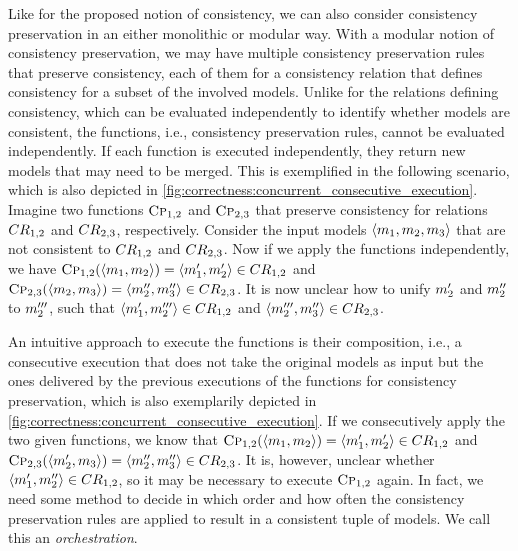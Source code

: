 Like for the proposed notion of consistency, we can also consider consistency preservation in an either monolithic or modular way.
With a modular notion of consistency preservation, we may have multiple consistency preservation rules that preserve consistency, each of them for a consistency relation that defines consistency for a subset of the involved models.
Unlike for the relations defining consistency, which can be evaluated independently to identify whether models are consistent, the functions, i.e., consistency preservation rules, cannot be evaluated independently.
If each function is executed independently, they return new models that may need to be merged. 
This is exemplified in the following scenario, which is also depicted in \autoref{fig:correctness:concurrent_consecutive_execution}.
Imagine two functions $\textsc{Cp}_{1,2}$ and $\textsc{Cp}_{2,3}$ that preserve consistency for relations $\consistencyrelation{CR}{1,2}$ and $\consistencyrelation{CR}{2,3}$, respectively.
Consider the input models $\tupled{\model{m}{1}, \model{m}{2}, \model{m}{3}}$ that are not consistent to $\consistencyrelation{CR}{1,2}$ and $\consistencyrelation{CR}{2,3}$.
Now if we apply the functions independently, we have $\function{Cp}_{1,2}(\tupled{\model{m}{1}, \model{m}{2}}) = \tupled{\model{m}{1}', \model{m}{2}'} \in \consistencyrelation{CR}{1,2}$ and 
$\function{Cp}_{2,3}(\tupled{\model{m}{2}, \model{m}{3}}) = \tupled{\model{m}{2}'', \model{m}{3}''} \in \consistencyrelation{CR}{2,3}$.
It is now unclear how to unify $\model{m}{2}'$ and $\model{m}{2}''$ to $\model{m}{2}'''$, such that $\tupled{\model{m}{1}', \model{m}{2}'''} \in \consistencyrelation{CR}{1,2}$ and  $\tupled{\model{m}{2}''', \model{m}{3}''} \in \consistencyrelation{CR}{2,3}$.

An intuitive approach to execute the functions is their composition, i.e., a consecutive execution that does not take the original models as input but the ones delivered by the previous executions of the functions for consistency preservation, which is also exemplarily depicted in \autoref{fig:correctness:concurrent_consecutive_execution}.
If we consecutively apply the two given functions, we know that $\function{Cp}_{1,2}(\tupled{\model{m}{1}, \model{m}{2}}) = \tupled{\model{m}{1}', \model{m}{2}'} \in \consistencyrelation{CR}{1,2}$ and 
$\function{Cp}_{2,3}(\tupled{\model{m}{2}', \model{m}{3}}) = \tupled{\model{m}{2}'', \model{m}{3}''} \in \consistencyrelation{CR}{2,3}$.
It is, however, unclear whether $\tupled{\model{m}{1}', \model{m}{2}''} \in \consistencyrelation{CR}{1,2}$, so it may be necessary to execute $\textsc{Cp}_{1,2}$ again.
In fact, we need some method to decide in which order and how often the consistency preservation rules are applied to result in a consistent tuple of models.
We call this an \emph{orchestration}.

